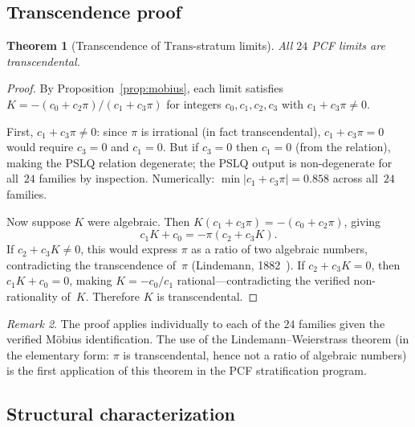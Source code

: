 \documentclass{amsart}
\newtheorem{theorem}{Theorem}[section]
\theoremstyle{definition}
\theoremstyle{remark}
\newtheorem{remark}[theorem]{Remark}
\newcommand{\Trans}{\mathrm{Trans}}
\newcommand{\abs}[1]{\lvert #1 \rvert}
\begin{document}
\subsection{Transcendence proof}\label{ss:transcendence}

\begin{theorem}[Transcendence of $\Trans$-stratum limits]\label{thm:trans}
All $24$ PCF limits are transcendental.
\end{theorem}

\begin{proof}
By Proposition~\ref{prop:mobius}, each limit satisfies
$K = -(c_0 + c_2\pi)/(c_1 + c_3\pi)$ for integers $c_0, c_1, c_2, c_3$
with $c_1 + c_3\pi \ne 0$.

First, $c_1 + c_3\pi \ne 0$: since $\pi$ is irrational (in fact
transcendental), $c_1 + c_3\pi = 0$ would require $c_3 = 0$ and
$c_1 = 0$.  But if $c_3 = 0$ then $c_1 = 0$ (from the relation), making
the PSLQ relation degenerate; the PSLQ output is non-degenerate for
all~$24$ families by inspection.  Numerically:
$\min\abs{c_1 + c_3\pi} = 0.858$ across all~$24$ families.

Now suppose $K$ were algebraic.  Then $K(c_1 + c_3\pi) = -(c_0 + c_2\pi)$,
giving
\begin{equation}\label{eq:lindemann}
  c_1 K + c_0 = -\pi(c_2 + c_3 K).
\end{equation}
If $c_2 + c_3 K \ne 0$, this would express $\pi$ as a ratio of two
algebraic numbers, contradicting the transcendence of~$\pi$ (Lindemann,
1882~\cite{lindemann}).  If $c_2 + c_3 K = 0$, then $c_1 K + c_0 = 0$,
making $K = -c_0/c_1$ rational---contradicting the verified non-rationality
of~$K$.  Therefore $K$ is transcendental.
\end{proof}

\begin{remark}\label{rem:lindemann}
The proof applies individually to each of the $24$ families given the
verified M\"obius identification.  The use of the Lindemann--Weierstrass
theorem (in the elementary form: $\pi$ is transcendental, hence not a
ratio of algebraic numbers) is the first application of this theorem in
the PCF stratification program.
\end{remark}

\subsection{Structural characterization}\label{ss:structural}
\end{document}
